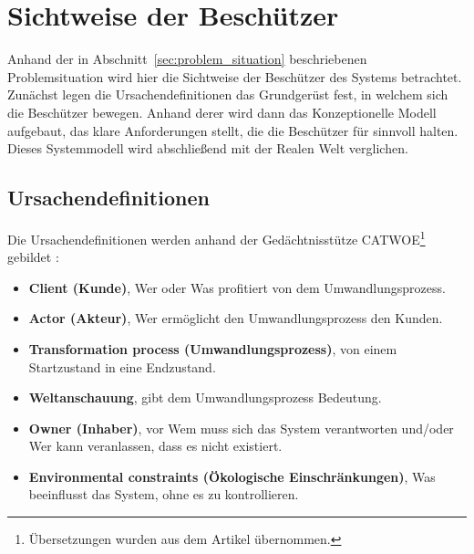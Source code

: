 \documentclass[11pt,a4paper]{report}
\begin{document}

\section{Sichtweise der Beschützer} 

Anhand der in Abschnitt~\ref{sec:problem_situation} beschriebenen Problemsituation wird hier die Sichtweise der Beschützer des Systems betrachtet. Zunächst legen die Ursachendefinitionen das Grundgerüst fest, in welchem sich die Beschützer bewegen. Anhand derer wird dann das Konzeptionelle Modell aufgebaut, das klare Anforderungen stellt, die die Beschützer für sinnvoll halten. Dieses Systemmodell wird abschließend mit der Realen Welt verglichen.

\subsection{Ursachendefinitionen}

Die Ursachendefinitionen werden anhand der Gedächtnisstütze CATWOE\footnote{Übersetzungen wurden aus dem Artikel \cite{ssmger} übernommen.} gebildet \cite{bobwill}:


\begin{itemize}[leftmargin=*]
\item \textbf{Client (Kunde)}, Wer oder Was profitiert von dem Umwandlungsprozess.
\item \textbf{Actor (Akteur)}, Wer ermöglicht den Umwandlungsprozess den Kunden.
\item \textbf{Transformation process (Umwandlungsprozess)}, von einem Startzustand in eine Endzustand.
\item \textbf{Weltanschauung}, gibt dem Umwandlungsprozess Bedeutung.
\item \textbf{Owner (Inhaber)}, vor Wem muss sich das System verantworten und/oder Wer kann veranlassen, dass es nicht existiert.
\item \textbf{Environmental constraints (Ökologische Einschränkungen)}, Was beeinflusst das System, ohne es zu kontrollieren.
\end{itemize}
\end{document}
